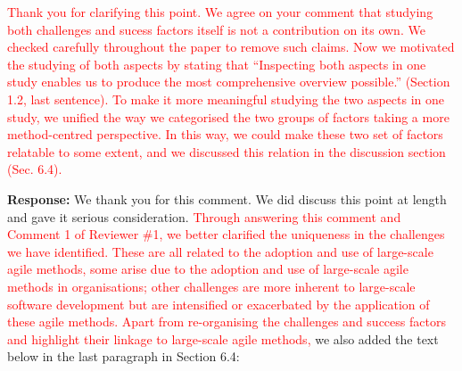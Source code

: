 \documentclass[a4paper,twoside,11pt]{reviewresponse}
\begin{document}
\textcolor{red}{Thank you for clarifying this point. We agree on your comment that studying both challenges and sucess factors itself is not a contribution on its own. We checked carefully throughout the paper to remove such claims. Now we motivated the studying of both aspects by stating that  ``Inspecting both aspects in one study enables us to produce the most comprehensive overview possible.'' (Section 1.2, last sentence). To make it more meaningful studying the two aspects in one study, we unified the way we categorised the two groups of factors taking a more method-centred perspective. In this way, we could make these two set of factors relatable to some extent, and we discussed this relation in the discussion section (Sec. 6.4).}

\textbf{Response:}
We thank you for this comment. We did discuss this point at length and gave it serious consideration. \textcolor{red}{Through answering this comment and Comment 1 of Reviewer \#1, we better clarified the uniqueness in the challenges we have identified. These are all related to the adoption and use of large-scale agile methods, some arise due to the adoption and use of large-scale agile methods in organisations; other challenges are more inherent to large-scale software development but are intensified or exacerbated by the application of these agile methods. Apart from re-organising the challenges and success factors and highlight their linkage to large-scale agile methods,} we also added the text below in the last paragraph in Section 6.4:
\end{document}
